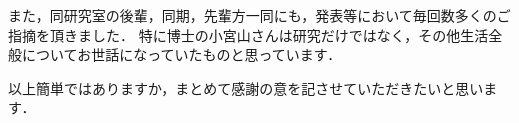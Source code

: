 \documentclass[master]{suribt}
\theoremstyle{definition}
\begin{document}
 また，同研究室の後輩，同期，先輩方一同にも，発表等において毎回数多くのご指摘を頂きました．
 特に博士の小宮山さんは研究だけではなく，その他生活全般についてお世話になっていたものと思っています．
 
 以上簡単ではありますか，まとめて感謝の意を記させていただきたいと思います．


  \appendix%

  
\end{document}
